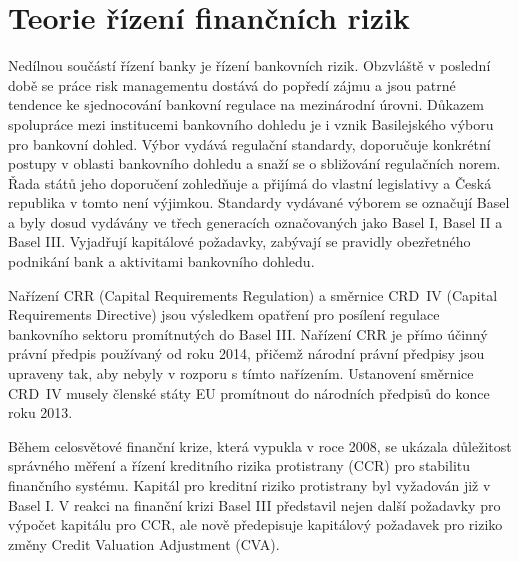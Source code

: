 \documentclass[a4paper,12pt]{report}
\theoremstyle{definition} \newtheorem{definice}[veta]{Definice}
\theoremstyle{remark}
\begin{document}
\chapter{Teorie řízení finančních rizik} \label{rizika_kap}


Nedílnou součástí řízení banky je řízení bankovních rizik.
Obzvláště v poslední době se práce risk managementu dostává do popředí zájmu
a jsou patrné tendence ke sjednocování bankovní regulace na mezinárodní úrovni.
Důkazem spolupráce mezi institucemi bankovního dohledu je i vznik Basilejského výboru pro bankovní dohled.
Výbor vydává regulační standardy, doporučuje konkrétní postupy v oblasti bankovního dohledu a snaží se o sbližování regulačních norem. 
Řada států jeho doporučení zohledňuje a přijímá do vlastní legislativy a Česká republika v tomto není výjimkou.
Standardy vydávané výborem se označují Basel a byly dosud vydávány ve třech generacích označovaných jako Basel I, Basel II a Basel III. 
Vyjadřují kapitálové požadavky, zabývají se pravidly obezřetného podnikání bank a aktivitami bankovního dohledu.


Nařízení CRR (Capital Requirements Regulation) \cite{EU2013} a
směrnice CRD~IV (Capital Requirements Directive) \cite{EU2013a}
jsou výsledkem opatření pro posílení regulace bankovního sektoru promítnutých do Basel III.
Nařízení CRR je přímo účinný právní předpis používaný od roku 2014, přičemž národní právní předpisy jsou upraveny tak, aby nebyly v rozporu s tímto nařízením. 
Ustanovení směrnice CRD~IV musely členské státy EU promítnout do národních předpisů do konce roku 2013.

Během celosvětové finanční krize, která vypukla v roce 2008, se ukázala důležitost správného měření a řízení kreditního rizika protistrany (CCR) pro stabilitu finančního systému.
Kapitál pro kreditní riziko protistrany byl vyžadován již v Basel I.  
V reakci na finanční krizi Basel III představil nejen další požadavky pro výpočet kapitálu pro CCR, ale nově
předepisuje kapitálový požadavek pro riziko změny Credit Valuation Adjustment (CVA). 
\end{document}
